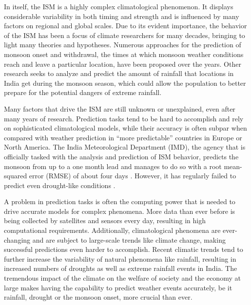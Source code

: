 In itself, the ISM is a highly complex climatological phenomenon. It displays considerable variability in both timing and strength and is influenced by many factors on regional and global scales. Due to its evident importance, the behavior of the ISM has been a focus of climate researchers for many decades, bringing to light many theories and hypotheses. Numerous approaches for the prediction of monsoon onset and withdrawal, the times at which monsoon weather conditions reach and leave a particular location, have been proposed over the years. Other research seeks to analyze and predict the amount of rainfall that locations in India get during the monsoon season, which could allow the population to better prepare for the potential dangers of extreme rainfall.

Many factors that drive the ISM are still unknown or unexplained, even after many years of research. Prediction tasks tend to be hard to accomplish and rely on sophisticated climatological models, while their accuracy is often subpar when compared with weather prediction in ``more predictable'' countries in Europe or North America. The India Meteorological Department (IMD), the agency that is officially tasked with the analysis and prediction of ISM behavior, predicts the monsoon from up to a one month lead and manages to do so with a root mean-squared error (RMSE) of about four days \citep{Pradhan.2017}. However, it has regularly failed to predict even drought-like conditions \citep{Paliwal.24.09.2017}.

A problem in prediction tasks is often the computing power that is needed to drive accurate models for complex phenomena. More data than ever before is being collected by satellites and sensors every day, resulting in high computational requirements. Additionally, climatological phenomena are ever-changing and are subject to large-scale trends like climate change, making successful predictions even harder to accomplish. Recent climatic trends tend to further increase the variability of natural phenomena like rainfall, resulting in increased numbers of droughts as well as extreme rainfall events in India. The tremendous impact of the climate on the welfare of society and the economy at large makes having the capability to predict weather events accurately, be it rainfall, drought or the monsoon onset, more crucial than ever.

